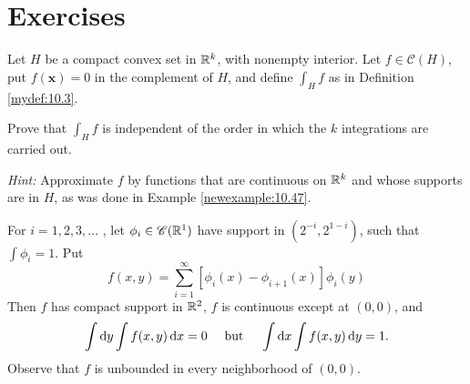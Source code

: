 
\section{Exercises}


\begin{myexercise}
    \label{ex:10.1}
    Let $H$ be a compact convex set in ${\protect\mathbb R}^k$, with nonempty interior.
    Let $f \in \mathscr{C}(H)$, put $f(\mathbf{x}) = 0$ in the complement of $H$,
    and define $\int_H f$ as in Definition \ref{mydef:10.3}.

    Prove that $\int_H f$ is independent of the order in which the $k$ integrations are carried out.

    \emph{Hint:} Approximate $f$ by functions that are continuous on ${\protect\mathbb R}^k$ and whose supports are in $H$, as was done in Example \ref{newexample:10.47}.
\end{myexercise}


\begin{myexercise}
    \label{ex:10.2}
    For $i = 1, 2, 3, ...$ , let $\phi_i \in \mathscr{C}({\protect\mathbb R}^1)$ have support in $(2^{-i} , 2^{1-i})$, such that $\int \phi_i = 1$.
    Put
    \begin{equation*}
        f(x,y) = \sum_{i=1}^{\infty}
        \left[
            \phi_{i}(x) -
            \phi_{i+1}(x)
            \right] \phi_i (y)
    \end{equation*}
    Then $f$ has compact support in ${\protect\mathbb R}^2$,
    $f$ is continuous except at $(0,0)$,
    and
    \begin{equation*}
        \int \d y \int f(x,y) \d x = 0
        \quad \text{ but } \quad
        \int \d x \int f(x,y) \d y = 1.
    \end{equation*}
    Observe that $f$ is unbounded in every neighborhood of $(0, 0)$.
\end{myexercise}


